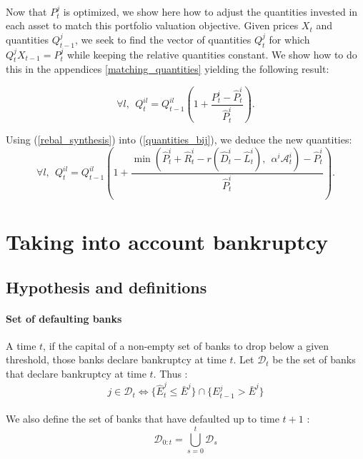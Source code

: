 \documentclass{article}
\newcommand{\wh}{\widehat}
\begin{document}
\paragraph{}
Now that $P_t^{j}$ is optimized, we show here how to adjust the quantities invested in each asset to match this portfolio valuation objective. Given prices $X_t$ and quantities $Q_{t-1}^j$, we seek to find the vector of quantities $Q_t^{j}$ for which $Q_t^{j}X_{t-1} = P_t^{j}$ while keeping the relative quantities constant. We show how to do this in the appendices \ref{matching_quantities} yielding the following result: 

\begin{equation}\label{quantities_bij}
\forall l,~~ Q_t^{il} = Q_{t-1}^{il}\left(1 + \frac{P_t^i - \widehat{P}_t^i}{\widehat{P}_t^i} \right).
\end{equation}



Using (\ref{rebal_synthesis}) into (\ref{quantities_bij}), we deduce the new quantities:
\begin{equation}\label{eq:rebal_quantities}
\forall l,~~ Q_t^{il} = Q_{t-1}^{il}\left(1 + \frac{\min(\widehat{P}_t^i + \widehat{R}_t^i - r(\wh D_t^i - \wh L_t^i),~~\alpha^i \mathcal{A}_t^i) - \widehat{P}_t^i}{\widehat{P}_t^i} \right).
\end{equation}


\section{Taking into account bankruptcy}\label{dynamic with bankruptcy}

\subsection{Hypothesis and definitions}

\paragraph{Set of defaulting banks}
A time $t$, if the capital of a non-empty set of banks to drop below a given threshold, those banks declare bankruptcy at time $t$. Let $\mathcal{D}_t$ be the set of banks that declare bankruptcy at time $t$. Thus : $$j \in \mathcal{D}_{t} \Leftrightarrow \{ \widehat{E}_{t}^j \leq \bar{E}^j \} \cap \{ E_{t-1}^j > \bar{E}^j \} $$

\paragraph{}    
We also define the set of banks that have defaulted up to time $t+1$ :
$$\mathcal{D}_{0:t} = \bigcup_{s=0}^{t} \mathcal{D}_s $$
\end{document}
